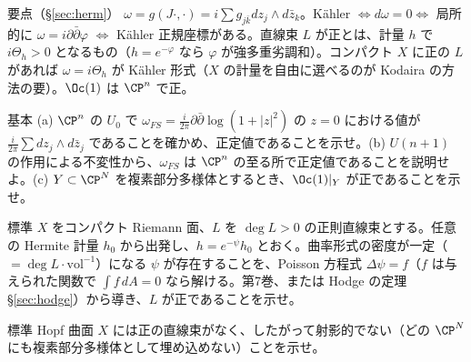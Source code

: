 \begin{keybox}{要点（\S\ref{sec:herm}）}
$\omega=g(J\cdot,\cdot)=i\sum g_{j\bar k}dz_j\wedge d\bar z_k$。Kähler $\iff d\omega=0\iff$ 局所的に $\omega=i\partial\bar\partial\varphi$ $\iff$ Kähler 正規座標がある。直線束 $L$ が正とは、計量 $h$ で $i\Theta_h>0$ となるもの（$h=e^{-\varphi}$ なら $\varphi$ が強多重劣調和）。コンパクト $X$ に正の $L$ があれば $\omega=i\Theta_h$ が Kähler 形式（$X$ の計量を自由に選べるのが Kodaira の方法の要）。$\Oc(1)$ は $\CP^n$ で正。
\end{keybox}

\begin{prob}{基本}\label{p:fsposit}
(a) $\CP^n$ の $U_0$ で $\omega_{FS}=\frac i{2\pi}\partial\bar\partial\log(1+|z|^2)$ の $z=0$ における値が $\frac i{2\pi}\sum dz_j\wedge d\bar z_j$ であることを確かめ、正定値であることを示せ。(b) $U(n+1)$ の作用による不変性から、$\omega_{FS}$ は $\CP^n$ の至る所で正定値であることを説明せよ。(c) $Y\subset\CP^N$ を複素部分多様体とするとき、$\Oc(1)|_Y$ が正であることを示せ。
\end{prob}
\begin{prob}{標準}\label{p:posdeg}
$X$ をコンパクト Riemann 面、$L$ を $\deg L>0$ の正則直線束とする。任意の Hermite 計量 $h_0$ から出発し、$h=e^{-\psi}h_0$ とおく。曲率形式の密度が一定（$=\deg L\cdot\mathrm{vol}^{-1}$）になる $\psi$ が存在することを、Poisson 方程式 $\Delta\psi=f$（$f$ は与えられた関数で $\int f\,dA=0$ なら解ける。第7巻、または Hodge の定理 \S\ref{sec:hodge}）から導き、$L$ が正であることを示せ。
\end{prob}
\begin{prob}{標準}\label{p:hopfnopos}
Hopf 曲面 $X$ には正の直線束がなく、したがって射影的でない（どの $\CP^N$ にも複素部分多様体として埋め込めない）ことを示せ。
\end{prob}

